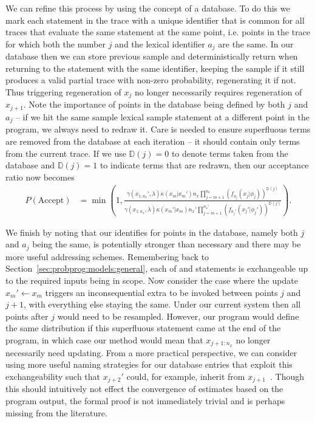 We can refine this process by using the concept of a database.  To do this we mark each \sample
statement in the trace with a unique identifier that is common for all traces that evaluate the same \sample
statement at the same point, i.e. points in the trace for which both the \sample number $j$ and 
the lexical \sample identifier $a_j$ are the same.  In our database then we can store previous
sample and deterministically return when returning to the \sample statement with the same identifier, keeping
the sample if it still produces a valid partial trace with non-zero probability,
regenerating it if not.  Thus triggering regeneration of $x_j$ no longer necessarily requires regeneration of $x_{j+1}$.
Note the importance of points in the database being defined by both $j$ and $a_j$ -- if we hit the same sample
lexical sample statement at a different point in the program, we always need to redraw it.
Care is needed to ensure superfluous terms are removed from the database at each iteration -- it should
contain only terms from the current trace.  If we use $\mathbb{D}(j)=0$ to denote terms taken from
the database and $\mathbb{D}(j)=1$ to indicate terms that are redrawn, then our acceptance ratio now becomes
\begin{align}
P(\text{Accept}) &= \min\left(1, \frac{\gamma(x_{1:n_x}',\lambda) \kappa(x_m | x_{m}') n_x \prod_{j=m+1}^{n_x} 
	\left(f_{a_{j}} (x_j | \phi_j)\right)^{\mathbb{D}(j)}}
{\gamma(x_{1:n_x},\lambda) \kappa(x_m' | x_{m})  n_x' \prod_{j=m+1}^{n_x'} \left(f_{a_{j}'} (x_j' | \phi_j')\right)^{\mathbb{D}(j)}}\right).
\end{align}

We finish by noting that our identifies for points in the database, namely both $j$ and $a_j$ being the same, is
potentially stronger than necessary and there may be more useful addressing schemes.  Remembering back
to Section~\ref{sec:probprog:models:general}, each of \sample and \observe statements is exchangeable up to
the required inputs being in scope.  Now consider the case where the update $x_m'\leftarrow x_m$ triggers an
inconsequential extra \sample to be invoked between points $j$ and $j+1$, with everything else staying the same.
Under our current system then all points after $j$ would need to be resampled.  However, our program would
define the same distribution if this superfluous \sample statement came at the end of the program, in which case
our method would mean that $x_{j+1:n_x}$ no longer necessarily need updating.  From a more practical perspective,
we can consider using more useful naming strategies for our database entries that exploit this exchangeability such
that $x_{j+2}'$ could, for example, inherit from $x_{j+1}$~\citep{wingate2011lightweight}.  Though this should
intuitively not effect the convergence of estimates based on the program output, the formal proof is not immediately
trivial and is perhaps missing from the literature.

